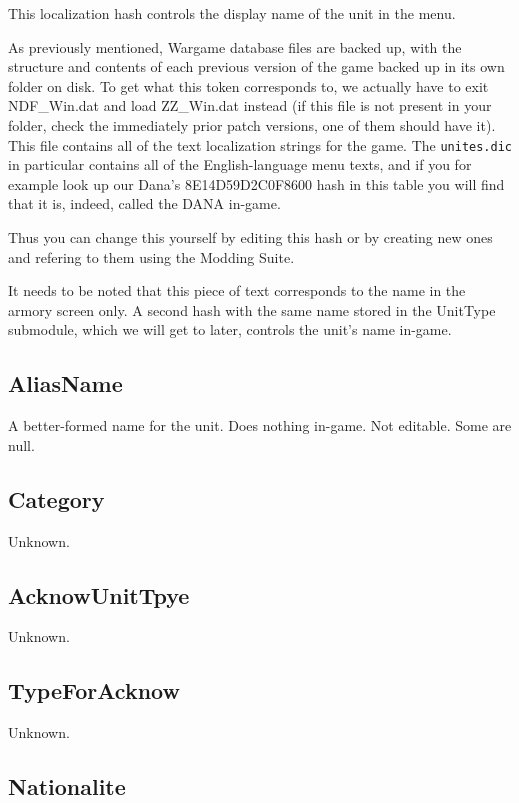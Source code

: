 \documentclass{article}
\begin{document}
This localization hash controls the display name of the unit in the menu.

As previously mentioned, Wargame database files are backed up, with the structure and contents of each previous version of the game backed up in its own folder on disk. To get what this token corresponds to, we actually have to exit NDF\_Win.dat and load ZZ\_Win.dat instead (if this file is not present in your folder, check the immediately prior patch versions, one of them should have it). This file contains all of the text localization strings for the game. The \texttt{unites.dic} in particular contains all of the English-language menu texts, and if you for example look up our Dana's 8E14D59D2C0F8600 hash in this table you will find that it is, indeed, called the DANA in-game.

Thus you can change this yourself by editing this hash or by creating new ones and refering to them using the Modding Suite.

It needs to be noted that this piece of text corresponds to the name in the armory screen only. A second hash with the same name stored in the UnitType submodule, which we will get to later, controls the unit's name in-game.

\subsection{AliasName}

A better-formed name for the unit. Does nothing in-game. Not editable. Some are null.

\subsection{Category}

Unknown.

\subsection{AcknowUnitTpye}

Unknown.

\subsection{TypeForAcknow}

Unknown.

\subsection{Nationalite}
\end{document}
